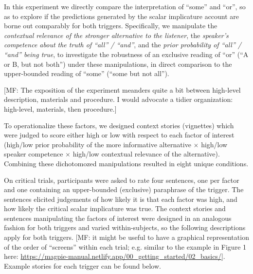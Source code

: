 \documentclass{sp}
\newcommand{\mf}[1]{\textcolor{BurntOrange}{[MF: #1]}}
\begin{document}
In this experiment we directly compare the interpretation of ``some'' and ``or'', so as to explore if the predictions generated by the scalar implicature account are borne out comparably for both triggers. Specifically, we manipulate the \textit{contextual relevance of the stronger alternative to the listener}, the \textit{speaker's competence about the truth of ``all'' / ``and''}, and the \textit{prior probability of ``all'' / ``and'' being true}, to investigate the robustness of an exclusive reading of ``or'' (``A or B, but not both'') under these manipulations, in direct comparison to the upper-bounded reading of “some” (``some but not all'').

\mf{The exposition of the experiment meanders quite a bit between high-level description, materials and procedure. I would advocate a tidier organization: high-level, materials, then procedure.}

To operationalize these factors, we designed context stories (vignettes) which were judged to score either high or low with respect to each factor of interest (high/low prior probability of the more informative alternative $\times$ high/low speaker competence $\times$ high/low contextual relevance of the alternative). Combining these dichotomozed manipulations resulted in eight unique conditions. 

On critical trials, participants were asked to rate four sentences, one per factor and one containing an upper-bounded (exclusive) paraphrase of the trigger. The sentences elicited judgements of how likely it is that each factor was high, and how likely the critical scalar implicature was true. The context stories and sentences manipulating the factors of interest were designed in an analogous fashion for both triggers and varied within-subjects, so the following descriptions apply for both triggers.
\mf{it might be useful to have a graphical representation of the order of ``screens'' within each trial; e.g. similar to the example in Figure 1 here: \url{https://magpie-manual.netlify.app/00_getting_started/02_basics/}}. Example stories for each trigger can be found below.
\end{document}
